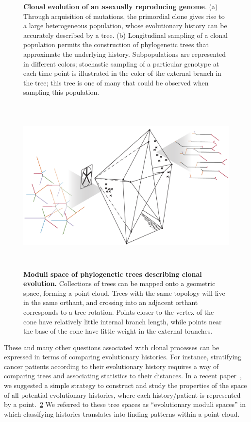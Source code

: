 \documentclass[a4paper,11pt]{article}
\begin{document}
\begin{figure}
\begin{subfigure}{0.5\linewidth}
    \end{subfigure}
    \caption{{\bf Clonal evolution of an asexually reproducing genome}. (a) Through acquisition of mutations, the primordial clone gives rise to a large heterogeneous population, whose evolutionary history can be accurately described by a tree. (b) Longitudinal sampling of a clonal population permits the construction of phylogenetic trees that approximate the underlying history. Subpopulations are represented in different colors; stochastic sampling of a particular genotype at each time point is illustrated in the color of the external branch in the tree; this tree is one of many that could be observed when sampling this population.}
     \label{fig:illustration_1}
\end{figure}


\begin{figure}
    \centering
    \includegraphics[height=3.5in]{../figures/illustration_BHV_5.png}
    \caption{{\bf Moduli space of phylogenetic trees describing clonal evolution.} Collections of trees can be mapped onto a geometric space, forming a point cloud. Trees with the same topology will live in the same orthant, and crossing into an adjacent orthant corresponds to a tree rotation. Points closer to the vertex of the cone have relatively little internal branch length, while points near the base of the cone have little weight in the external branches.}
    \label{fig:illustration_2}
\end{figure}

These and many other questions associated with clonal processes can be expressed in terms of comparing evolutionary histories.
For instance, stratifying cancer patients according to their evolutionary history requires a way of comparing trees and associating statistics to their distances.
In a recent paper~\cite{zairis2014moduli}, we suggested a simple strategy to construct and study the properties of the space of all potential evolutionary histories, where each history/patient is represented by a point.~\ref{fig:illustration_2}
We referred to these tree spaces as ``evolutionary moduli spaces'' in which classifying histories translates into finding patterns within a point cloud.
\end{document}
